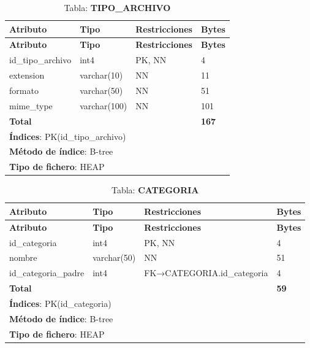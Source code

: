 \begin{longtable}{|l|l|p{5cm}|p{4cm}|}
\caption{Tabla: \textbf{TIPO\_ARCHIVO}}\label{pf_tipo_archivo}\\ \hline
\textbf{Atributo} & \textbf{Tipo} & \textbf{Restricciones} & \textbf{Bytes}\\ \hline
\endfirsthead
\hline \textbf{Atributo} & \textbf{Tipo} & \textbf{Restricciones} & \textbf{Bytes}\\ \hline
\endhead
id\_tipo\_archivo & int4         & PK, NN & 4  \\ \hline
extension         & varchar(10)  & NN     & 11 \\ \hline
formato           & varchar(50)  & NN     & 51 \\ \hline
mime\_type        & varchar(100) & NN     & 101\\ \hline
\textbf{Total} &                 &        & \textbf{167}\\ \hline
\multicolumn{4}{|l|}{\textbf{Índices}: PK(id\_tipo\_archivo)} \\ \hline
\multicolumn{4}{|l|}{\textbf{Método de índice}: B-tree}\\ \hline
\multicolumn{4}{|l|}{\textbf{Tipo de fichero}: HEAP}\\ \hline
\end{longtable}

\begin{longtable}{|l|l|p{5cm}|p{4cm}|}
\caption{Tabla: \textbf{CATEGORIA}}\label{pf_categoria}\\ \hline
\textbf{Atributo} & \textbf{Tipo} & \textbf{Restricciones} & \textbf{Bytes}\\ \hline
\endfirsthead
\hline \textbf{Atributo} & \textbf{Tipo} & \textbf{Restricciones} & \textbf{Bytes}\\ \hline
\endhead
id\_categoria       & int4        & PK, NN                      & 4  \\ \hline
nombre              & varchar(50) & NN                          & 51 \\ \hline
id\_categoria\_padre & int4        & FK→CATEGORIA.id\_categoria  & 4  \\ \hline
\textbf{Total} &                 &                             & \textbf{59}\\ \hline
\multicolumn{4}{|l|}{\textbf{Índices}: PK(id\_categoria)} \\ \hline
\multicolumn{4}{|l|}{\textbf{Método de índice}: B-tree}\\ \hline
\multicolumn{4}{|l|}{\textbf{Tipo de fichero}: HEAP}\\ \hline
\end{longtable}


